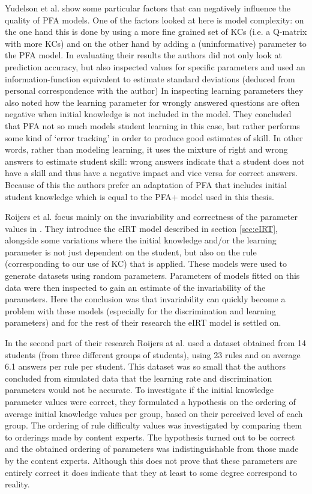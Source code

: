 \documentclass{scrartcl}
\begin{document}
Yudelson et al. show some particular factors that can negatively influence the quality of PFA models. One of the factors looked at here is model complexity: on the one hand this is done by using a more fine grained set of KCs (i.e. a Q-matrix with more KCs) and on the other hand by adding a (uninformative) parameter to the PFA model. In evaluating their results the authors did not only look at prediction accuracy, but also inspected values for specific parameters and used an information-function equivalent to estimate standard deviations (deduced from personal correspondence with the author) In inspecting learning parameters they also noted how the learning parameter for wrongly answered questions are often negative when initial knowledge is not included in the model. They concluded that PFA not so much models student learning in this case, but rather performs some kind of `error tracking' in order to produce good estimates of skill. In other words, rather than modeling learning, it uses the mixture of right and wrong answers to estimate student skill: wrong answers indicate that a student does not have a skill and thus have a negative impact and vice versa for correct answers. Because of this the authors prefer an adaptation of PFA that includes initial student knowledge which is equal to the PFA+ model used in this thesis.

Roijers et al. focus mainly on the invariability and correctness of the parameter values in \cite{eirt}. They introduce the eIRT model described in section \ref{sec:eIRT}, alongside some variations where the initial knowledge and/or the learning parameter is not just dependent on the student, but also on the rule (corresponding to our use of KC) that is applied. These models were used to generate datasets using random parameters. Parameters of models fitted on this data were then inspected to gain an estimate of the invariability of the parameters. Here the conclusion was that invariability can quickly become a problem with these models (especially for the discrimination and learning parameters) and for the rest of their research the eIRT model is settled on.

In the second part of their research Roijers at al. used a dataset obtained from 14 students (from three different groups of students), using 23 rules and on average 6.1 answers per rule per student. This dataset was so small that the authors concluded from simulated data that the learning rate and discrimination parameters would not be accurate. To investigate if the initial knowledge parameter values were correct, they formulated a hypothesis on the ordering of average initial knowledge values per group, based on their perceived level of each group. 
The ordering of rule difficulty values was investigated by comparing them to orderings made by content experts. The hypothesis turned out to be correct and the obtained ordering of parameters was indistinguishable from those made by the content experts. Although this does not prove that these parameters are entirely correct it does indicate that they at least to some degree correspond to reality.
\end{document}
